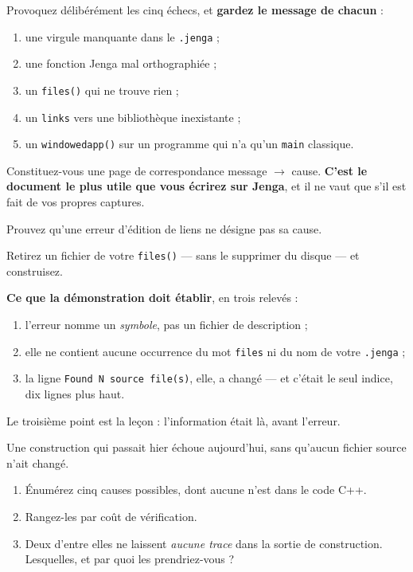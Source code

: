 \begin{nkpratique}
Provoquez délibérément les cinq échecs, et \textbf{gardez le message de chacun} :

\begin{enumerate}
\item une virgule manquante dans le \texttt{.jenga} ;
\item une fonction Jenga mal orthographiée ;
\item un \texttt{files()} qui ne trouve rien ;
\item un \texttt{links} vers une bibliothèque inexistante ;
\item un \texttt{windowedapp()} sur un programme qui n'a qu'un \texttt{main}
      classique.
\end{enumerate}

Constituez-vous une page de correspondance message $\rightarrow$ cause.
\textbf{C'est le document le plus utile que vous écrirez sur Jenga}, et il ne
vaut que s'il est fait de vos propres captures.
\end{nkpratique}

\begin{nkdemo}
Prouvez qu'une erreur d'édition de liens ne désigne pas sa cause.

Retirez un fichier de votre \texttt{files()} --- sans le supprimer du disque ---
et construisez.

\textbf{Ce que la démonstration doit établir}, en trois relevés :
\begin{enumerate}
\item l'erreur nomme un \emph{symbole}, pas un fichier de description ;
\item elle ne contient aucune occurrence du mot \texttt{files} ni du nom de votre
      \texttt{.jenga} ;
\item la ligne \texttt{Found N source file(s)}, elle, a changé --- et c'était le
      seul indice, dix lignes plus haut.
\end{enumerate}

Le troisième point est la leçon : l'information était là, avant l'erreur.
\end{nkdemo}

\begin{nklogique}
Une construction qui passait hier échoue aujourd'hui, sans qu'aucun fichier
source n'ait changé.

\begin{enumerate}
\item Énumérez cinq causes possibles, dont aucune n'est dans le code C++.
\item Rangez-les par coût de vérification.
\item Deux d'entre elles ne laissent \emph{aucune trace} dans la sortie de
      construction. Lesquelles, et par quoi les prendriez-vous ?
\end{enumerate}
\end{nklogique}
